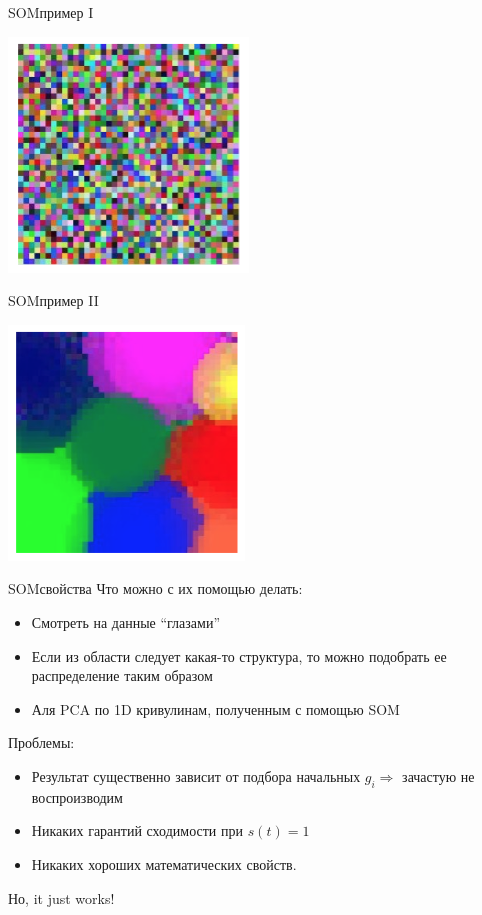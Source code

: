 \documentclass[14pt, fleqn, xcolor={dvipsnames, table}]{beamer}
\begin{document}
\begin{frame}{SOM}{пример I}
\begin{center}\includegraphics[height=0.7\textheight]{random_som.png}\end{center}
\end{frame}

\begin{frame}{SOM}{пример II}
\begin{center}\includegraphics[height=0.7\textheight]{sorted_som.png}\end{center}
\end{frame}



\begin{frame}{SOM}{свойства}
Что можно с их помощью делать:
\begin{itemize}
  \item Смотреть на данные ``глазами''
  \item Если из области следует какая-то структура, то можно подобрать ее распределение таким образом
  \item Аля PCA по 1D кривулинам, полученным с помощью SOM
\end{itemize}
Проблемы:
\begin{itemize}
  \item Результат существенно зависит от подбора начальных $g_i \Rightarrow$ зачастую не воспроизводим
  \item Никаких гарантий сходимости при $s(t) = 1$
  \item Никаких хороших математических свойств.
\end{itemize}
Но, it just works!
\end{frame}
\end{document}
